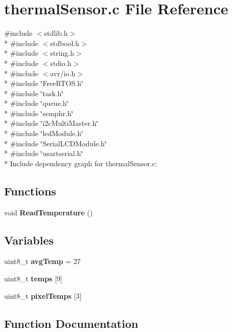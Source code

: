 \section{thermal\+Sensor.\+c File Reference}
\label{thermal_sensor_8c}
{\ttfamily \#include $<$stdlib.\+h$>$}\\*
{\ttfamily \#include $<$stdbool.\+h$>$}\\*
{\ttfamily \#include $<$string.\+h$>$}\\*
{\ttfamily \#include $<$stdio.\+h$>$}\\*
{\ttfamily \#include $<$avr/io.\+h$>$}\\*
{\ttfamily \#include \char`\"{}Free\+R\+T\+O\+S.\+h\char`\"{}}\\*
{\ttfamily \#include \char`\"{}task.\+h\char`\"{}}\\*
{\ttfamily \#include \char`\"{}queue.\+h\char`\"{}}\\*
{\ttfamily \#include \char`\"{}semphr.\+h\char`\"{}}\\*
{\ttfamily \#include \char`\"{}i2c\+Multi\+Master.\+h\char`\"{}}\\*
{\ttfamily \#include \char`\"{}led\+Module.\+h\char`\"{}}\\*
{\ttfamily \#include \char`\"{}Serial\+L\+C\+D\+Module.\+h\char`\"{}}\\*
{\ttfamily \#include \char`\"{}usartserial.\+h\char`\"{}}\\*
Include dependency graph for thermal\+Sensor.\+c\+:
\subsection*{Functions}
\begin{DoxyCompactItemize}
\item 
void {\bf Read\+Temperature} ()
\end{DoxyCompactItemize}
\subsection*{Variables}
\begin{DoxyCompactItemize}
\item 
uint8\+\_\+t {\bf avg\+Temp} = 27
\item 
uint8\+\_\+t {\bf temps} [9]
\item 
uint8\+\_\+t {\bf pixel\+Temps} [3]
\end{DoxyCompactItemize}


\subsection{Function Documentation}
